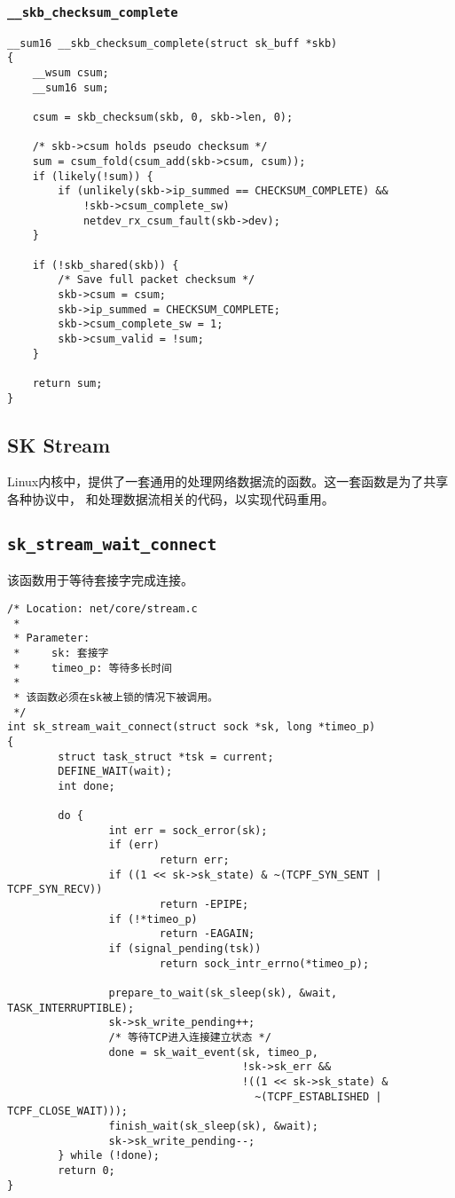            \subsubsection{\texttt{__skb_checksum_complete}}
\begin{verbatim}
__sum16 __skb_checksum_complete(struct sk_buff *skb)
{
    __wsum csum;
    __sum16 sum;

    csum = skb_checksum(skb, 0, skb->len, 0);

    /* skb->csum holds pseudo checksum */
    sum = csum_fold(csum_add(skb->csum, csum));
    if (likely(!sum)) {
        if (unlikely(skb->ip_summed == CHECKSUM_COMPLETE) &&
            !skb->csum_complete_sw)
            netdev_rx_csum_fault(skb->dev);
    }

    if (!skb_shared(skb)) {
        /* Save full packet checksum */
        skb->csum = csum;
        skb->ip_summed = CHECKSUM_COMPLETE;
        skb->csum_complete_sw = 1;
        skb->csum_valid = !sum;
    }

    return sum;
}
\end{verbatim}    
        \subsection{SK Stream}
Linux内核中，提供了一套通用的处理网络数据流的函数。这一套函数是为了共享各种协议中，
和处理数据流相关的代码，以实现代码重用。
\subsection{\texttt{sk_stream_wait_connect}}
该函数用于等待套接字完成连接。
\begin{verbatim}
/* Location: net/core/stream.c
 *
 * Parameter:
 *     sk: 套接字
 *     timeo_p: 等待多长时间
 *
 * 该函数必须在sk被上锁的情况下被调用。
 */
int sk_stream_wait_connect(struct sock *sk, long *timeo_p)
{
        struct task_struct *tsk = current;
        DEFINE_WAIT(wait);
        int done;

        do {
                int err = sock_error(sk);
                if (err)
                        return err;
                if ((1 << sk->sk_state) & ~(TCPF_SYN_SENT | TCPF_SYN_RECV))
                        return -EPIPE;
                if (!*timeo_p)
                        return -EAGAIN;
                if (signal_pending(tsk))
                        return sock_intr_errno(*timeo_p);

                prepare_to_wait(sk_sleep(sk), &wait, TASK_INTERRUPTIBLE);
                sk->sk_write_pending++;
                /* 等待TCP进入连接建立状态 */
                done = sk_wait_event(sk, timeo_p,
                                     !sk->sk_err &&
                                     !((1 << sk->sk_state) &
                                       ~(TCPF_ESTABLISHED | TCPF_CLOSE_WAIT)));
                finish_wait(sk_sleep(sk), &wait);
                sk->sk_write_pending--;
        } while (!done);
        return 0;
}
\end{verbatim}

